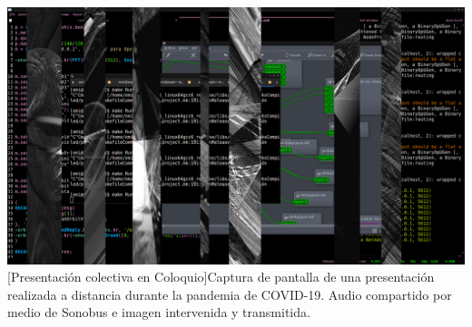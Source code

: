 \begin{itemize}
\begin{Figure} 
\includegraphics[width=\columnwidth]{../img/col2.png} 
[Presentación colectiva en Coloquio]{Captura de pantalla de una presentación realizada a distancia durante la pandemia de COVID-19. Audio compartido por medio de Sonobus e imagen intervenida y transmitida.} %
\label{fig:gallery} 
\end{Figure}


\end{itemize}

